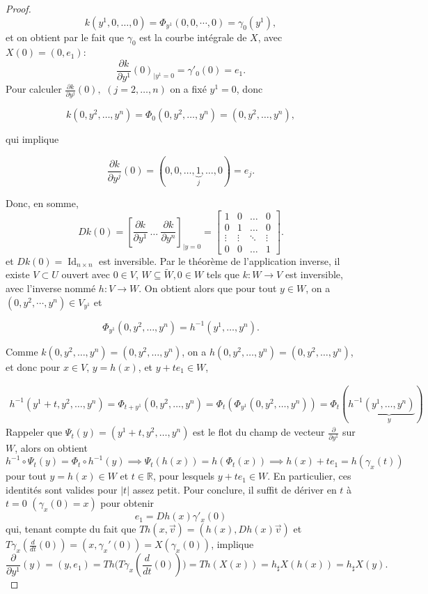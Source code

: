 \documentclass[french]{article}
\theoremstyle{definition}
\newcommand{\R}{\mathbb{R}}
\begin{document}
\begin{proof}
  \[k(y^1, 0, \dots, 0) = \Phi_{y^1} (0, 0, \cdots, 0) =  \gamma_{0}(y^1), \] et on obtient par le fait que \(\gamma_{0}\) est la courbe int\'egrale de $X$, avec $X(0) = (0, e_1)$:
  \[
  \displaystyle \frac{\partial k}{\partial y^1}(0)_{\mid y^1=0} = \gamma'_{0}(0)  =  e_1.
  \]  Pour calculer \(\displaystyle \frac{\partial k}{\partial y^j}(0), \,\, (j = 2, \dots,n)\)
 on a fixé \(y^1 = 0\), donc

  \[k(0, y^2, \dots, y^n) = \Phi_0(0, y^2, \dots, y^n) = (0, y^2, \dots, y^n), \]

  qui implique

  \[\frac{\partial k }{\partial y^{j}} (0) = (0,0, \dots, \underbrace{1}_{j}, \dots, 0) =e_j. \]

  Donc, en somme,
  \[
  Dk(0) = \left[ \frac{\partial k }{\partial y^{1}} \ \dots \ \frac{\partial k }{\partial y^{n}}  \right]_{\mid y=0} = \begin{bmatrix}
      1 & 0 & \dots & 0 \\
      0 & 1 & \dots & 0 \\
      \vdots & \vdots & \ddots & \vdots \\
      0 & 0 & \dots & 1
  \end{bmatrix}.
  \]
  et \(D k(0) = \operatorname{Id}_{n \times n}\) est inversible. Par le théorème de l'application inverse, il existe \(V \subset U\) ouvert avec \(0 \in V\), \(W \subseteq \widetilde{W}, 0 \in W\) tels que \(k: W \to V\) est inversible, avec l'inverse nomm\'e $h : V\to W$. On obtient alors que pour tout $y\in W$, on a $(0,y^2, \cdots, y^n) \in V_{y^1}$ et

  \[\Phi _{y^1}(0, y^2, \dots, y^n) = h ^{-1}(y^1, \dots, y^n).\]

 Comme \(k(0, y^2, \dots, y^n) = (0, y^2, \dots, y^n)\), on a \(h(0, y^2, \dots, y^n) = (0, y^2, \dots, y^n) \), et donc pour $x\in V$, $y= h(x)$, et $y+te_1 \in W$,

  \begin{gather*}
    h ^{-1}(y^1+t, y^2, \dots, y^n) = \Phi _{t+y^1}(0, y^2, \dots, y^n) = \Phi_t(\Phi _{y^1}(0, y^2, \dots, y^n)) = \Phi_t (h ^{-1}\underbrace{(y^1, \dots, y^n)}_{y})
  \end{gather*} Rappeler que \(\Psi_t(y) =  (y^1+t, y^2, \dots, y^n)\) est le flot du champ de vecteur \(\displaystyle \frac{\partial}{\partial y ^{1}}\) sur $W$,  alors on obtient
  \[
  h^{-1} \circ  \Psi_t (y) =  \Phi_t \circ h^{-1} (y) \implies      \Psi_t (h(x)) =  h(\Phi_t (x))  \implies    h(x) + te_1 =  h(\gamma_x(t))
  \] pour tout $y = h(x) \in W$ et $t\in \R$, pour lesquels $y+ te_1  \in W$.  En particulier, ces identit\'es  sont valides pour $|t|$ assez petit. Pour conclure, il suffit de d\'eriver en $t$ \`a $t=0$ \((\gamma_x(0) = x)\) pour obtenir
  \[
   e_1 =  Dh(x) \gamma'_x(0)
   \] qui, tenant compte du fait que $Th(x,\vec v) = (h(x), Dh(x) \vec v)$ et $T\gamma_x (\frac{d}{d t}(0))= (x, \gamma_x'(0)) = X(\gamma_x(0))$, implique
   \[
       \displaystyle \frac{\partial}{\partial y^1}(y) = (y,e_1) = Th \Big (T\gamma_x (\frac{d}{d t}(0))\Big ) = Th (X (x)) = h_\sharp X(h(x)) = h_\sharp X(y).
   \]
\end{proof}
\end{document}
